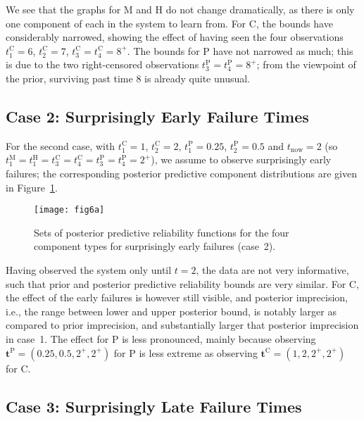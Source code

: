 \documentclass[Journal,letterpaper]{ascelike-new}
\renewcommand{\vec}[1]{{\bm#1}}
\def\tnow{t_\text{now}}
\begin{document}
We see that the graphs for M and H do not change dramatically,
as there is only one component of each in the system to learn from.
For C, the bounds have considerably narrowed,
showing the effect of having seen the four observations
$t_1^\text{C} = 6$, $t_2^\text{C} = 7$, $t_3^\text{C} = t_4^\text{C} = 8^+$.
The bounds for P have not narrowed as much;
this is due to the two right-censored observations $t_3^\text{P} = t_4^\text{P} = 8^+$;
from the viewpoint of the prior, surviving past time 8 is already quite unusual.

\subsection{Case 2: Surprisingly Early Failure Times}
\label{sec:ex-case2}

For the second case, with $t_1^\text{C} = 1$, $t_2^\text{C} = 2$, $t_1^\text{P} = 0.25$, $t_2^\text{P} = 0.5$
and $\tnow = 2$ (so $t_1^\text{M} = t_1^\text{H} = t_3^\text{C} = t_4^\text{C} = t_3^\text{P} = t_4^\text{P} = 2^+$),
we assume to observe surprisingly early failures;
the corresponding posterior predictive component distributions are given in Figure~\ref{fig:comppost-2}.
%
\begin{figure}
\texttt{[image: fig6a]}
\caption{Sets of posterior predictive reliability functions for the four component types
for surprisingly early failures (case~2).}
\label{fig:comppost-2}
\end{figure}
%
Having observed the system only until $t = 2$, the data are not very informative,
such that prior and posterior predictive reliability bounds are very similar.
For C, the effect of the early failures is however still visible,
and posterior imprecision, i.e., the range between lower and upper posterior bound, is notably larger
as compared to prior imprecision, and substantially larger that posterior imprecision in case~1.
The effect for P is less pronounced,
mainly because observing $\vec{t}^\text{P} = (0.25, 0.5, 2^+, 2^+)$ for P is less extreme
as observing $\vec{t}^\text{C} = (1, 2, 2^+, 2^+)$ for C.

\subsection{Case 3: Surprisingly Late Failure Times}
\label{sec:ex-case3}
\end{document}

